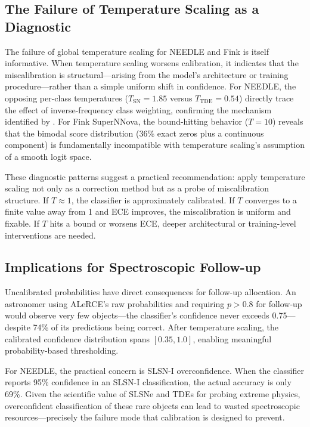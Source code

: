 \documentclass[twocolumn]{aastex631}
\begin{document}
\subsection{The Failure of Temperature Scaling as a Diagnostic}

The failure of global temperature scaling for NEEDLE and Fink is itself informative. When temperature scaling worsens calibration, it indicates that the miscalibration is structural---arising from the model's architecture or training procedure---rather than a simple uniform shift in confidence. For NEEDLE, the opposing per-class temperatures ($T_{\text{SN}} = 1.85$ versus $T_{\text{TDE}} = 0.54$) directly trace the effect of inverse-frequency class weighting, confirming the mechanism identified by \citet{vandengoorbergh2022}. For Fink SuperNNova, the bound-hitting behavior ($T = 10$) reveals that the bimodal score distribution (36\% exact zeros plus a continuous component) is fundamentally incompatible with temperature scaling's assumption of a smooth logit space.

These diagnostic patterns suggest a practical recommendation: apply temperature scaling not only as a correction method but as a probe of miscalibration structure. If $T \approx 1$, the classifier is approximately calibrated. If $T$ converges to a finite value away from 1 and ECE improves, the miscalibration is uniform and fixable. If $T$ hits a bound or worsens ECE, deeper architectural or training-level interventions are needed.

\subsection{Implications for Spectroscopic Follow-up}

Uncalibrated probabilities have direct consequences for follow-up allocation. An astronomer using ALeRCE's raw probabilities and requiring $p > 0.8$ for follow-up would observe very few objects---the classifier's confidence never exceeds 0.75---despite 74\% of its predictions being correct. After temperature scaling, the calibrated confidence distribution spans $[0.35, 1.0]$, enabling meaningful probability-based thresholding.

For NEEDLE, the practical concern is SLSN-I overconfidence. When the classifier reports 95\% confidence in an SLSN-I classification, the actual accuracy is only 69\%. Given the scientific value of SLSNe and TDEs for probing extreme physics, overconfident classification of these rare objects can lead to wasted spectroscopic resources---precisely the failure mode that calibration is designed to prevent.
\end{document}
